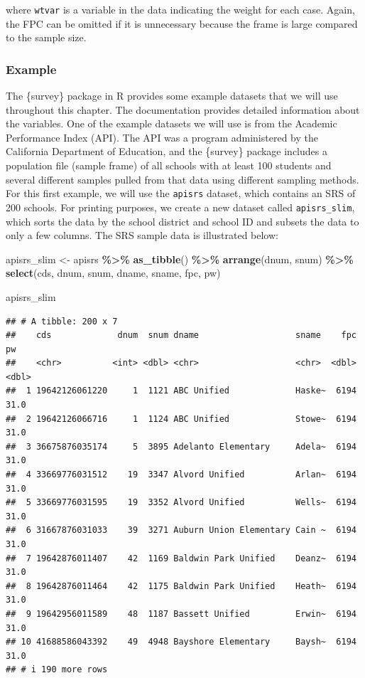 \documentclass[
]{krantz}
\makeatletter
\newenvironment{Shaded}{\begin{snugshade}}{\end{snugshade}}
\newcommand{\FunctionTok}[1]{\textcolor[rgb]{0.27,0.27,0.27}{\textbf{#1}}}
\newcommand{\NormalTok}[1]{#1}
\newcommand{\OtherTok}[1]{\textcolor[rgb]{0.37,0.37,0.37}{#1}}
\newcommand{\SpecialCharTok}[1]{\textcolor[rgb]{0.43,0.43,0.43}{\textbf{#1}}}
\newenvironment{kframe}{%
\medskip{}
\setlength{\fboxsep}{.8em}
 \def\at@end@of@kframe{}%
 \ifinner\ifhmode%
  \def\at@end@of@kframe{\end{minipage}}%
  \begin{minipage}{\columnwidth}%
 \fi\fi%
 \def\FrameCommand##1{\hskip\@totalleftmargin \hskip-\fboxsep
 \colorbox{shadecolor}{##1}\hskip-\fboxsep
     \hskip-\linewidth \hskip-\@totalleftmargin \hskip\columnwidth}%
 \MakeFramed {\advance\hsize-\width
   \@totalleftmargin\z@ \linewidth\hsize
   \@setminipage}}%
 {\par\unskip\endMakeFramed%
 \at@end@of@kframe}
\renewenvironment{Shaded}{\begin{kframe}}{\end{kframe}}
\makeatother
\begin{document}
where \texttt{wtvar} is a variable in the data indicating the weight for each case. Again, the FPC can be omitted if it is unnecessary because the frame is large compared to the sample size.

\hypertarget{example-2}{%
\subsubsection*{Example}\label{example-2}}


The \{survey\} package in R provides some example datasets that we will use throughout this chapter. The documentation provides detailed information about the variables. One of the example datasets we will use is from the Academic Performance Index (API). The API was a program administered by the California Department of Education, and the \{survey\} package includes a population file (sample frame) of all schools with at least 100 students and several different samples pulled from that data using different sampling methods. For this first example, we will use the \texttt{apisrs} dataset, which contains an SRS of 200 schools. For printing purposes, we create a new dataset called \texttt{apisrs\_slim}, which sorts the data by the school district and school ID and subsets the data to only a few columns. The SRS sample data is illustrated below:

\begin{Shaded}
\begin{Highlighting}[]
\NormalTok{apisrs\_slim }\OtherTok{\textless{}{-}}
\NormalTok{  apisrs }\SpecialCharTok{\%\textgreater{}\%}
  \FunctionTok{as\_tibble}\NormalTok{() }\SpecialCharTok{\%\textgreater{}\%}
  \FunctionTok{arrange}\NormalTok{(dnum, snum) }\SpecialCharTok{\%\textgreater{}\%}
  \FunctionTok{select}\NormalTok{(cds, dnum, snum, dname, sname, fpc, pw)}

\NormalTok{apisrs\_slim}
\end{Highlighting}
\end{Shaded}

\begin{verbatim}
## # A tibble: 200 x 7
##    cds             dnum  snum dname                   sname    fpc    pw
##    <chr>          <int> <dbl> <chr>                   <chr>  <dbl> <dbl>
##  1 19642126061220     1  1121 ABC Unified             Haske~  6194  31.0
##  2 19642126066716     1  1124 ABC Unified             Stowe~  6194  31.0
##  3 36675876035174     5  3895 Adelanto Elementary     Adela~  6194  31.0
##  4 33669776031512    19  3347 Alvord Unified          Arlan~  6194  31.0
##  5 33669776031595    19  3352 Alvord Unified          Wells~  6194  31.0
##  6 31667876031033    39  3271 Auburn Union Elementary Cain ~  6194  31.0
##  7 19642876011407    42  1169 Baldwin Park Unified    Deanz~  6194  31.0
##  8 19642876011464    42  1175 Baldwin Park Unified    Heath~  6194  31.0
##  9 19642956011589    48  1187 Bassett Unified         Erwin~  6194  31.0
## 10 41688586043392    49  4948 Bayshore Elementary     Baysh~  6194  31.0
## # i 190 more rows
\end{verbatim}
\end{document}
